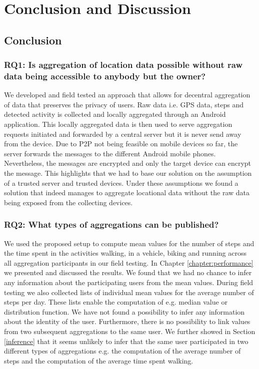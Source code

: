 \chapter{Conclusion and Discussion}\label{chapter:conclusion}
\section{Conclusion}

\subsection*{RQ1: Is aggregation of location data possible without raw data being accessible to anybody but the owner?}
We developed and field tested an approach that allows for decentral aggregation of data that preserves the privacy of users. Raw data i.e. GPS data, steps and detected activity is collected and locally aggregated through an Android application. This locally aggregated data is then used to serve aggregation requests initiated and forwarded by a central server but it is never send away from the device. Due to P2P not being feasible on mobile devices so far, the server forwards the messages to the different Android mobile phones. Nevertheless, the messages are encrypted and only the target device can encrypt the message. This highlights that we had to base our solution on the assumption of a trusted server and trusted devices. Under these assumptions we found a solution that indeed manages to aggregate locational data without the raw data being exposed from the collecting devices.

\subsection*{RQ2: What types of aggregations can be published?}
We used the proposed setup to compute mean values for the number of steps and the time spent in the activities walking, in a vehicle, biking and running across all aggregation participants in our field testing. In Chapter \ref{chapter:performance} we presented and discussed the results. We found that we had no chance to infer any information about the participating users from the mean values. During field testing we also collected lists of individual mean values for the average number of steps per day. These lists enable the computation of e.g. median value or distribution function. We have not found a possibility to infer any information about the identity of the user. Furthermore, there is no possibility to link values from two subsequent aggregations to the same user. We further showed in Section \ref{inference} that it seems unlikely to infer that the same user participated in two different types of aggregations e.g. the computation of the average number of steps and the computation of the average time spent walking.

